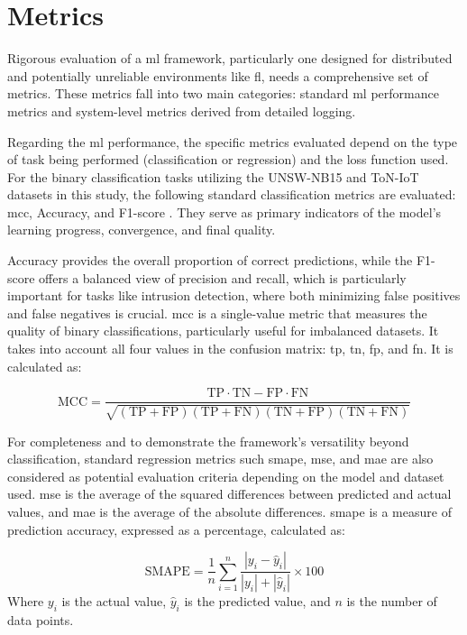 \section{Metrics}
\label{sec:metrics}


Rigorous evaluation of a \ac{ml} framework, particularly one designed for distributed and potentially unreliable environments like \ac{fl}, needs a comprehensive set of metrics. These metrics fall into two main categories: standard \ac{ml} performance metrics and system-level metrics derived from detailed logging.

Regarding the \ac{ml} performance, the specific metrics evaluated depend on the type of task being performed (classification or regression) and the loss function used. For the binary classification tasks utilizing the UNSW-NB15 and ToN-IoT datasets in this study, the following standard classification metrics are evaluated: \ac{mcc}, Accuracy, and F1-score \cite{chicco2020advantages, diallo2024machine}. They serve as primary indicators of the model's learning progress, convergence, and final quality.

Accuracy provides the overall proportion of correct predictions, while the F1-score offers a balanced view of precision and recall, which is particularly important for tasks like intrusion detection, where both minimizing false positives and false negatives is crucial. \ac{mcc} is a single-value metric that measures the quality of binary classifications, particularly useful for imbalanced datasets. It takes into account all four values in the confusion matrix: \ac{tp}, \ac{tn}, \ac{fp}, and \ac{fn}. It is calculated as:

\begin{equation}
    \text{MCC} = \frac{\text{TP} \cdot \text{TN} - \text{FP} \cdot \text{FN}}{\sqrt{(\text{TP} + \text{FP})(\text{TP} + \text{FN})(\text{TN} + \text{FP})(\text{TN} + \text{FN})}}
\end{equation}

For completeness and to demonstrate the framework's versatility beyond classification, standard regression metrics such \ac{smape}, \ac{mse}, and \ac{mae} \cite{chicco2021coefficient} are also considered as potential evaluation criteria depending on the model and dataset used. \ac{mse} is the average of the squared differences between predicted and actual values, and \ac{mae} is the average of the absolute differences. \ac{smape} is a measure of prediction accuracy, expressed as a percentage, calculated as:

\begin{equation}
    \text{SMAPE} = \frac{1}{n} \sum_{i=1}^{n} \frac{|y_i - \hat{y}_i|}{|y_i| + |\hat{y}_i|} \times 100
\end{equation}
Where \(y_i\) is the actual value, \(\hat{y}_i\) is the predicted value, and \(n\) is the number of data points.

